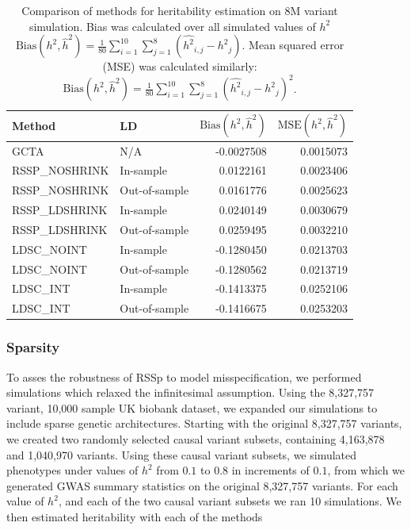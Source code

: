 \begin{table}
\begin{tabular}{l|l|r|r}
\hline
Method & LD & $\text{Bias}(h^2,\hat{h}^2)$ & $\text{MSE}(h^2,\hat{h}^2)$\\
\hline
GCTA & N/A & -0.0027508 & 0.0015073\\
\hline
RSSP\_NOSHRINK & In-sample & 0.0122161 & 0.0023406\\
\hline
RSSP\_NOSHRINK & Out-of-sample & 0.0161776 & 0.0025623\\
\hline
RSSP\_LDSHRINK & In-sample & 0.0240149 & 0.0030679\\
\hline
RSSP\_LDSHRINK & Out-of-sample & 0.0259495 & 0.0032210\\
\hline
LDSC\_NOINT & In-sample & -0.1280450 & 0.0213703\\
\hline
LDSC\_NOINT & Out-of-sample & -0.1280562 & 0.0213719\\
\hline
LDSC\_INT & In-sample & -0.1413375 & 0.0252106\\
\hline
LDSC\_INT & Out-of-sample & -0.1416675 & 0.0253203\\
\hline
\end{tabular}\label{tab:gwas_sim_ave_error}
\caption{Comparison of methods for heritability estimation on 8M variant simulation.  Bias was calculated over all simulated values of $h^2$ $\text{Bias}(h^2,\hat{h}^2)=\frac{1}{80}\sum_{i=1}^{10}\sum_{j=1}^{8}(\hat{h^2}_{i,j}-{h^2}_j)$.   Mean squared error (MSE) was calculated similarly: $\text{Bias}(h^2,\hat{h}^2)=\frac{1}{80}\sum_{i=1}^{10}\sum_{j=1}^{8}{(\hat{h^2}_{i,j}-{h^2}_j)}^2$.}
\end{table}

\subsubsection{Sparsity}

To asses the robustness of RSSp to model misspecification, we performed simulations which relaxed the infinitesimal assumption.  Using the 8,327,757 variant, 10,000 sample UK biobank dataset, we expanded our simulations to include sparse genetic architectures.  Starting with the original 8,327,757 variants, we created two randomly selected causal variant subsets, containing  4,163,878  and 1,040,970 variants.  Using these causal variant subsets, we simulated phenotypes under values of  $h^2$ from $0.1$ to $0.8$ in increments of $0.1$, from which we generated GWAS summary statistics on the original 8,327,757 variants.  For each value of $h^2$, and each of the two causal variant subsets we ran 10 simulations.  We then estimated heritability with each of the methods 



